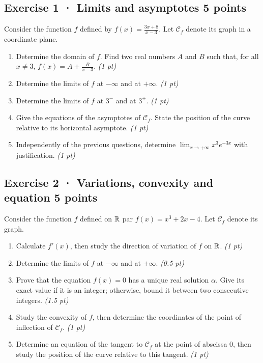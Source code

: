 \subsection*{Exercise 1 · Limits and asymptotes \hfill 5 points}Consider the function $f$ defined by $f(x)=\frac{3x+8}{x-3}$. Let $\mathcal C_f$ denote its graph in a coordinate plane.

\begin{enumerate}

\item Determine the domain of $f$. Find two real numbers $A$ and $B$ such that, for all $x\ne3$, $f(x)=A+\frac B{x-3}$. \hfill\textit{(1 pt)}

\item Determine the limits of $f$ at $-\infty$ and at $+\infty$. \hfill\textit{(1 pt)}

\item Determine the limits of $f$ at $3^-$ and at $3^+$. \hfill\textit{(1 pt)}

\item Give the equations of the asymptotes of $\mathcal C_f$. State the position of the curve relative to its horizontal asymptote. \hfill\textit{(1 pt)}

\item Independently of the previous questions, determine $\displaystyle\lim_{x\to+\infty}x^{3}e^{-3x}$ with justification. \hfill\textit{(1 pt)}

\end{enumerate}

\subsection*{Exercise 2 · Variations, convexity and equation \hfill 5 points}Consider the function $f$ defined on $\mathbb R$ par $f(x)=x^3+2x-4$. Let $\mathcal C_f$ denote its graph.

\begin{enumerate}

\item Calculate $f'(x)$, then study the direction of variation of $f$ on $\mathbb R$. \hfill\textit{(1 pt)}

\item Determine the limits of $f$ at $-\infty$ and at $+\infty$. \hfill\textit{(0.5 pt)}

\item Prove that the equation $f(x)=0$ has a unique real solution $\alpha$. Give its exact value if it is an integer; otherwise, bound it between two consecutive integers. \hfill\textit{(1.5 pt)}

\item Study the convexity of $f$, then determine the coordinates of the point of inflection of $\mathcal C_f$. \hfill\textit{(1 pt)}

\item Determine an equation of the tangent to $\mathcal C_f$ at the point of abscissa $0$, then study the position of the curve relative to this tangent. \hfill\textit{(1 pt)}

\end{enumerate}

